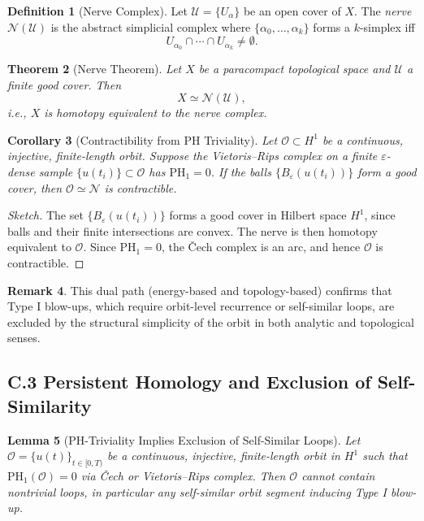 \documentclass[11pt]{article}
\newtheorem{theorem}{Theorem}[section]
\newtheorem{lemma}[theorem]{Lemma}
\newtheorem{corollary}[theorem]{Corollary}
\theoremstyle{definition}
\newtheorem{definition}[theorem]{Definition}
\newtheorem{remark}[theorem]{Remark}
\begin{document}
\begin{definition}[Nerve Complex]
Let \( \mathcal{U} = \{ U_\alpha \} \) be an open cover of \( X \). The \emph{nerve} \( \mathcal{N}(\mathcal{U}) \) is the abstract simplicial complex where \( \{ \alpha_0, \dots, \alpha_k \} \) forms a \( k \)-simplex iff
\[
U_{\alpha_0} \cap \cdots \cap U_{\alpha_k} \neq \emptyset.
\]
\end{definition}

\begin{theorem}[Nerve Theorem]
Let \( X \) be a paracompact topological space and \( \mathcal{U} \) a finite good cover. Then
\[
X \simeq \mathcal{N}(\mathcal{U}),
\]
i.e., \( X \) is homotopy equivalent to the nerve complex.
\end{theorem}

\begin{corollary}[Contractibility from PH Triviality]
Let \( \mathcal{O} \subset H^1 \) be a continuous, injective, finite-length orbit. Suppose the Vietoris–Rips complex on a finite \( \varepsilon \)-dense sample \( \{ u(t_i) \} \subset \mathcal{O} \) has \( \mathrm{PH}_1 = 0 \). If the balls \( \{ B_\varepsilon(u(t_i)) \} \) form a good cover, then \( \mathcal{O} \simeq \mathcal{N} \) is contractible.
\end{corollary}

\begin{proof}[Sketch]
The set \( \{ B_\varepsilon(u(t_i)) \} \) forms a good cover in Hilbert space \( H^1 \), since balls and their finite intersections are convex. The nerve is then homotopy equivalent to \( \mathcal{O} \). Since \( \mathrm{PH}_1 = 0 \), the Čech complex is an arc, and hence \( \mathcal{O} \) is contractible.
\end{proof}

\begin{remark}
This dual path (energy-based and topology-based) confirms that Type I blow-ups, which require orbit-level recurrence or self-similar loops, are excluded by the structural simplicity of the orbit in both analytic and topological senses.
\end{remark}

\subsection*{C.3 Persistent Homology and Exclusion of Self-Similarity}

\begin{lemma}[PH-Triviality Implies Exclusion of Self-Similar Loops]
Let \( \mathcal{O} = \{u(t)\}_{t \in [0,T)} \) be a continuous, injective, finite-length orbit in \( H^1 \) such that \( \mathrm{PH}_1(\mathcal{O}) = 0 \) via Čech or Vietoris–Rips complex. Then \( \mathcal{O} \) cannot contain nontrivial loops, in particular any self-similar orbit segment inducing Type I blow-up.
\end{lemma}
\end{document}
